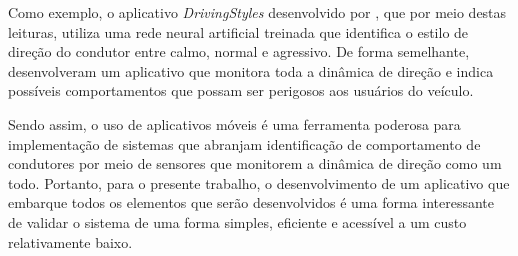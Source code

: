 Como exemplo, o aplicativo \textit{DrivingStyles} desenvolvido por , que por meio destas leituras, utiliza uma rede neural artificial treinada que identifica o estilo de direção do condutor entre calmo, normal e agressivo. De forma semelhante,  desenvolveram um aplicativo que monitora toda a dinâmica de direção e indica possíveis comportamentos que possam ser perigosos aos usuários do veículo.

Sendo assim, o uso de aplicativos móveis é uma ferramenta poderosa para implementação de sistemas que abranjam identificação de comportamento de condutores por meio de sensores que monitorem a dinâmica de direção como um todo. Portanto, para o presente trabalho, o desenvolvimento de um aplicativo que embarque todos os elementos que serão desenvolvidos é uma forma interessante de validar o sistema de uma forma simples, eficiente e acessível a um custo relativamente baixo.